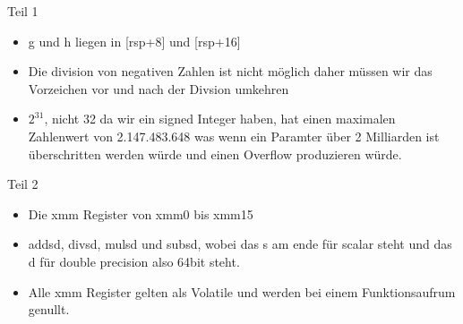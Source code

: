 \documentclass[11pt]{article}
\begin{document}

\newline
Teil 1
\newline
\begin{itemize}
    \item g und h liegen in [rsp+8] und [rsp+16]
    \item Die division von negativen Zahlen ist nicht möglich daher müssen wir das Vorzeichen vor und nach der Divsion umkehren
    \item $2^{31}$, nicht 32 da wir ein signed Integer haben, hat einen maximalen Zahlenwert von 2.147.483.648 was wenn ein Paramter über 2 Milliarden ist überschritten werden würde und einen Overflow produzieren würde.
\end{itemize}
\newline
Teil 2
\newline
\begin{itemize}
    \item Die xmm Register von xmm0 bis xmm15
    \item addsd, divsd, mulsd und subsd, wobei das s am ende für scalar steht und das d für double precision also 64bit steht.
    \item Alle xmm Register gelten als Volatile und werden bei einem Funktionsaufrum genullt.
\end{itemize}
\end{document}
